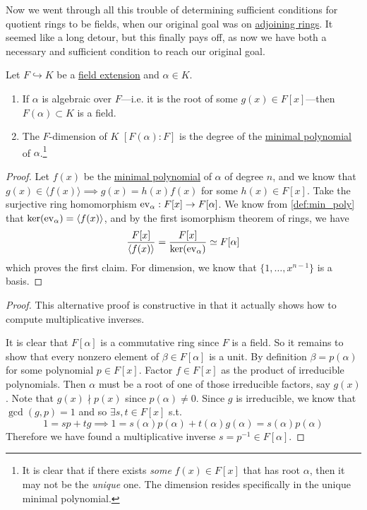   Now we went through all this trouble of determining sufficient conditions for quotient rings to be fields, when our original goal was on \hyperref[def:adjoining_ring]{adjoining rings}. It seemed like a long detour, but this finally pays off, as now we have both a necessary and sufficient condition to reach our original goal. 

  \begin{corollary}
    \label{thm:conditions-for-adjoining-ring-to-be-a-field}
    Let $F \hookrightarrow K$ be a \hyperref[def:field-extension]{field extension} and $\alpha \in K$. 
    \begin{enumerate}
      \item If $\alpha$ is algebraic over $F$---i.e. it is the root of some $g(x) \in F[x]$---then $F(\alpha) \subset K$ is a field. 
      \item The $F$-dimension of $K$ $[F(\alpha):F]$ is the degree of the \hyperref[def:min_poly]{minimal polynomial} of $\alpha$.\footnote{It is clear that if there exists \textit{some} $f(x) \in F[x]$ that has root $\alpha$, then it may not be the \textit{unique} one. The dimension resides specifically in the unique minimal polynomial. } 
    \end{enumerate}
  \end{corollary}
  \begin{proof} 
    Let $f(x)$ be the \hyperref[def:min_poly]{minimal polynomial} of $\alpha$ of degree $n$, and we know that $g(x) \in \langle f(x) \rangle \implies g(x) = h(x) f(x)$ for some $h(x) \in F[x]$. Take the surjective ring homomorphism $\operatorname{ev}_\alpha: F[x] \to F[\alpha]$. We know from \ref{def:min_poly} that $\ker(\operatorname{ev}_\alpha) = \langle f(x) \rangle$, and by the first isomorphism theorem of rings, we have 
    \begin{equation}
      \frac{F[x]}{\langle f(x) \rangle} = \frac{F[x]}{\ker(\operatorname{ev}_\alpha)} \simeq F[\alpha]
    \end{equation} 
    which proves the first claim. For dimension, we know that $\{1, \ldots, x^{n-1}\}$ is a basis. 
  \end{proof}
  \begin{proof}
    This alternative proof is constructive in that it actually shows how to compute multiplicative inverses. 

    It is clear that $F[\alpha]$ is a commutative ring since $F$ is a field. So it remains to show that every nonzero element of $\beta \in F[\alpha]$ is a unit. By definition $\beta = p(\alpha)$ for some polynomial $p \in F[x]$. Factor $f \in F[x]$ as the product of irreducible polynomials. Then $\alpha$ must be a root of one of those irreducible factors, say $g(x)$. Note that $g(x) \nmid p(x)$ since $p(\alpha) \neq 0$. Since $g$ is irreducible, we know that $\gcd(g, p) = 1$ and so $\exists s, t \in F[x]$ s.t. 
    \begin{equation}
      1 = s p + t g \implies 1 = s(\alpha) p(\alpha) + t(\alpha) g(\alpha) = s(\alpha) p(\alpha)
    \end{equation}  
    Therefore we have found a multiplicative inverse $s = p^{-1} \in F[\alpha]$. 
  \end{proof} 
